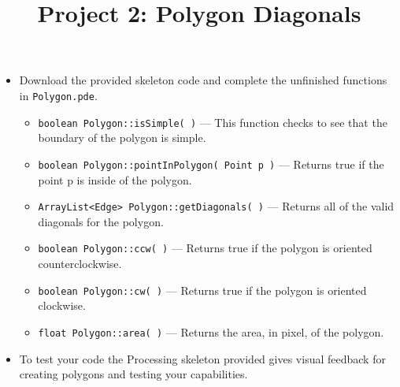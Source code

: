 \documentclass[a4paper,12pt]{article}
\title{Project 2: Polygon Diagonals}
\begin{document}
\maketitle


\projectGroundRules

\projectSubmission

\assignmentInstructions


\begin{itemize}

\item Download the provided skeleton code and complete the unfinished functions in \texttt{Polygon.pde}.

\begin{itemize}

   \item \texttt{boolean Polygon::isSimple( )} --- This function checks to see that the boundary of the polygon is simple.
   
   \item \texttt{boolean Polygon::pointInPolygon( Point p )} --- Returns true if the point p is inside of the polygon.
   
   \item \texttt{ArrayList<Edge> Polygon::getDiagonals( )} --- Returns all of the valid diagonals for the polygon.
   
   \item \texttt{boolean Polygon::ccw( )} --- Returns true if the polygon is oriented counterclockwise.
   
   \item \texttt{boolean Polygon::cw( )} --- Returns true if the polygon is oriented clockwise.
         
   \item \texttt{float Polygon::area( )} --- Returns the area, in pixel, of the polygon.
   
\end{itemize}

\item To test your code the Processing skeleton provided gives visual feedback for creating polygons and testing your capabilities.

\end{itemize}
\end{document}
